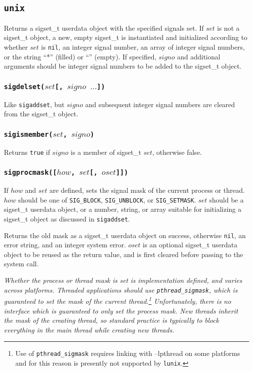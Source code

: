 \documentclass[11pt, oneside]{memoir}
\newcommand*{\lunix}[0]{\texttt{lunix}\xspace}
\newcommand*{\true}[0]{\texttt{true}\xspace}
\newcommand*{\nil}[0]{\texttt{nil}\xspace}
\newcommand*{\syscall}[1]{\texttt{#1}\xspace}
\newcommand*{\fn}[1]{\texttt{#1}\xspace}
\newcounter{toccols}
\newenvironment{Module}[1]{
	\subsection{\texttt{#1}}
	\addtocontents{toc}{
		\protect\begin{multicols}{\value{toccols}}
	}
}{
	\addtocontents{toc}{\protect\end{multicols}}
}
\begin{document}
\begin{Module}{unix}
Returns a sigset\_t userdata object with the specified signals set. If $set$ is not a sigset\_t object, a new, empty sigset\_t is instantiated and initialized according to whether $set$ is \nil, an integer signal number, an array of integer signal numbers, or the string ``*'' (filled) or ``'' (empty). If specified, $signo$ and additional arguments should be integer signal numbers to be added to the sigset\_t object.

\subsubsection[\fn{sigdelset}]{\fn{sigdelset($set$[, $signo$ $\ldots$])}}

Like \fn{sigaddset}, but $signo$ and subsequent integer signal numbers are cleared from the sigset\_t object.

\subsubsection[\fn{sigismember}]{\fn{sigismember($set$, $signo$)}}

Returns \true if $signo$ is a member of sigset\_t $set$, otherwise false.

\subsubsection[\fn{sigprocmask}]{\fn{sigprocmask([$how$, $set$[, $oset$]])}}

If $how$ and $set$ are defined, sets the signal mask of the current process or thread. $how$ should be one of \texttt{SIG\_BLOCK}, \texttt{SIG\_UNBLOCK}, or \texttt{SIG\_SETMASK}. $set$ should be a sigset\_t userdata object, or a number, string, or array suitable for initializing a sigset\_t object as discussed in \fn{sigaddset}.

Returns the old mask as a sigset\_t userdata object on success, otherwise \nil, an error string, and an integer system error. $oset$ is an optional sigset\_t userdata object to be reused as the return value, and is first cleared before passing to the system call.

\emph{Whether the process or thread mask is set is implementation defined, and varies across platforms. Threaded applications should use \syscall{pthread\_sigmask}, which is guaranteed to set the mask of the current thread.\footnote{Use of \syscall{pthread\_sigmask} requires linking with --lpthread on some platforms and for this reason is presently not supported by \lunix.} Unfortunately, there is no interface which is guaranteed to only set the process mask. New threads inherit the mask of the creating thread, so standard practice is typically to block everything in the main thread while creating new threads.}


\end{Module}
\end{document}
